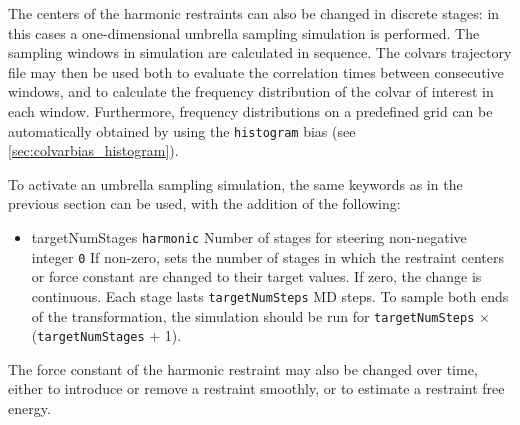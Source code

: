 
The centers of the harmonic restraints can also be changed in discrete stages: in this cases a one-dimensional umbrella sampling simulation is performed.
The sampling windows in simulation are calculated in sequence.
The colvars trajectory file may then be used both to evaluate the correlation times between consecutive windows, and to calculate the frequency distribution of the colvar of interest in each window.
Furthermore, frequency distributions on a predefined grid can be automatically obtained by using the \texttt{histogram} bias (see \ref{sec:colvarbias_histogram}).

To activate an umbrella sampling simulation, the same keywords as in the previous section can be used, with the addition of the following:
\begin{itemize}

\item %
  \keydef
    {targetNumStages}{%
    \texttt{harmonic}}{%
    Number of stages for steering}{%
    non-negative integer}{%
    \texttt{0}}{%
    If non-zero, sets the number of stages in which the restraint centers
    or force constant are changed to their target values. If zero, the change
    is continuous. Each stage lasts \texttt{targetNumSteps} MD steps.
    To sample both ends of the transformation, the simulation
    should be run for \texttt{targetNumSteps} $\times$ (\texttt{targetNumStages} + 1).}

\end{itemize}



The force constant of the harmonic restraint may also be changed over time, either to introduce or remove a restraint smoothly, or to estimate a restraint free energy\cite{Deng2009}.

